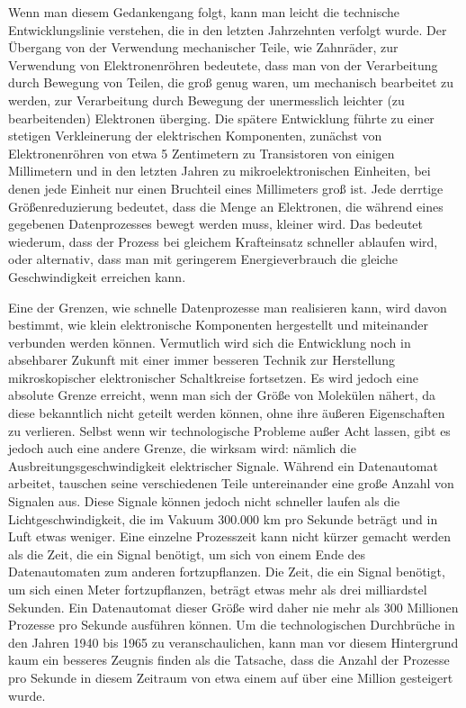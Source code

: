 {Wenn man diesem Gedankengang folgt, kann man leicht die technische Entwicklungslinie verstehen, die in den letzten Jahrzehnten verfolgt wurde. Der Übergang von der Verwendung mechanischer Teile, wie Zahnräder, zur Verwendung von Elektronenröhren bedeutete, dass man von der Verarbeitung durch Bewegung von Teilen, die groß genug waren, um mechanisch bearbeitet zu werden, zur Verarbeitung durch Bewegung der unermesslich leichter (zu bearbeitenden) Elektronen überging. Die spätere Entwicklung führte zu einer stetigen Verkleinerung der elektrischen Komponenten, zunächst von Elektronenröhren von etwa 5 Zentimetern zu Transistoren von einigen Millimetern und in den letzten Jahren zu mikroelektronischen Einheiten, bei denen jede Einheit nur einen Bruchteil eines Millimeters groß ist. Jede derrtige Größenreduzierung bedeutet, dass die Menge an Elektronen, die während eines gegebenen Datenprozesses bewegt werden muss, kleiner wird. Das bedeutet wiederum, dass der Prozess bei gleichem Krafteinsatz schneller ablaufen wird, oder alternativ, dass man mit geringerem Energieverbrauch die gleiche Geschwindigkeit erreichen kann.

Eine der Grenzen, wie schnelle Datenprozesse man realisieren kann, wird davon bestimmt, wie klein elektronische Komponenten hergestellt und miteinander verbunden werden können. Vermutlich wird sich die Entwicklung noch in absehbarer Zukunft mit einer immer besseren Technik zur Herstellung mikroskopischer elektronischer Schaltkreise fortsetzen. Es wird jedoch eine absolute Grenze erreicht, wenn man sich der Größe von Molekülen nähert, da diese bekanntlich nicht geteilt werden können, ohne ihre äußeren Eigenschaften zu verlieren. Selbst wenn wir technologische Probleme außer Acht lassen, gibt es jedoch auch eine andere Grenze, die wirksam wird: nämlich die Ausbreitungsgeschwindigkeit elektrischer Signale. Während ein Datenautomat arbeitet, tauschen seine verschiedenen Teile untereinander eine große Anzahl von Signalen aus. Diese Signale können jedoch nicht schneller laufen als die Lichtgeschwindigkeit, die im Vakuum 300.000 km pro Sekunde beträgt und in Luft etwas weniger. Eine einzelne Prozesszeit kann nicht kürzer gemacht werden als die Zeit, die ein Signal benötigt, um sich von einem Ende des Datenautomaten zum anderen fortzupflanzen. Die Zeit, die ein Signal benötigt, um sich einen Meter fortzupflanzen, beträgt etwas mehr als drei milliardstel Sekunden. Ein Datenautomat dieser Größe wird daher nie mehr als 300 Millionen Prozesse pro Sekunde ausführen können. Um die technologischen Durchbrüche in den Jahren 1940 bis 1965 zu veranschaulichen, kann man vor diesem Hintergrund kaum ein besseres Zeugnis finden als die Tatsache, dass die Anzahl der Prozesse pro Sekunde in diesem Zeitraum von etwa einem auf über eine Million gesteigert wurde.
}


